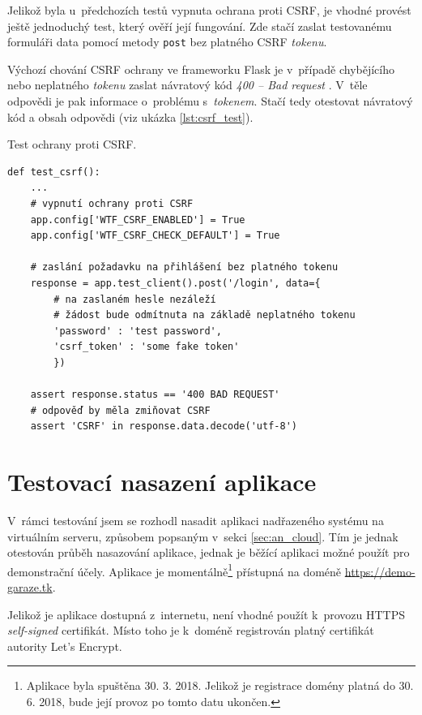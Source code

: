 Jelikož byla u~předchozích testů vypnuta ochrana proti CSRF, je vhodné provést ještě jednoduchý test, který ověří její fungování. Zde stačí zaslat testovanému formuláři data pomocí metody \texttt{post} bez platného CSRF \textit{tokenu}.

Výchozí chování CSRF ochrany ve frameworku Flask je v~případě chybějícího nebo neplatného \textit{tokenu} zaslat návratový kód \textit{400 -- Bad request} \cite{flask_wtf}. V~těle odpovědi je pak informace o~problému s~\textit{tokenem}. Stačí tedy otestovat návratový kód a obsah odpovědi (viz ukázka \ref{lst:csrf_test}).

\begin{listing}[htbp]
\caption{\label{lst:csrf_test} Test ochrany proti CSRF.}
\begin{verbatim}
def test_csrf():
    ...
    # vypnutí ochrany proti CSRF
    app.config['WTF_CSRF_ENABLED'] = True
    app.config['WTF_CSRF_CHECK_DEFAULT'] = True

    # zaslání požadavku na přihlášení bez platného tokenu
    response = app.test_client().post('/login', data={
        # na zaslaném hesle nezáleží
        # žádost bude odmítnuta na základě neplatného tokenu
        'password' : 'test password',
        'csrf_token' : 'some fake token'
        })

    assert response.status == '400 BAD REQUEST'
    # odpověď by měla zmiňovat CSRF
    assert 'CSRF' in response.data.decode('utf-8')
\end{verbatim}
\end{listing}


\section{Testovací nasazení aplikace}

V~rámci testování jsem se rozhodl nasadit aplikaci nadřazeného systému na virtuálním serveru, způsobem popsaným v~sekci \ref{sec:an_cloud}. Tím je jednak otestován průběh nasazování aplikace, jednak je běžící aplikaci možné použít pro demonstrační účely. Aplikace je momentálně\footnote{Aplikace byla spuštěna 30. 3. 2018. Jelikož je registrace domény platná do 30. 6. 2018, bude její provoz po tomto datu ukončen.} přístupná na doméně \url{https://demo-garaze.tk}.

Jelikož je aplikace dostupná z~internetu, není vhodné použít k~provozu HTTPS \textit{self-signed} certifikát. Místo toho je k~doméně registrován platný certifikát autority Let's Encrypt.

